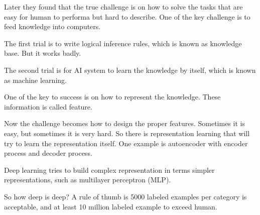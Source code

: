 Later they found that the true challenge is on how to solve the tasks that are easy for human to performa but hard to describe. One of the key challenge is to feed knowledge into computers.

The first trial is to write logical inference rules, which is known as knowledge base. But it works badly.

The second trial is for AI system to learn the knowledge by itself, which is known as machine learning.

One of the key to success is on how to represent the knowledge. These information is called feature.

Now the challenge becomes how to design the proper features. Sometimes it is easy, but sometimes it is very hard. So there is representation learning that will try to learn the representation itself. One example is autoencoder with encoder process and decoder process.

Deep learning tries to build complex representation in terms simpler representations, such as multilayer perceptron (MLP).

So how deep is deep? A rule of thumb is 5000 labeled examples per category is acceptable, and at least 10 million labeled example to exceed human.









































